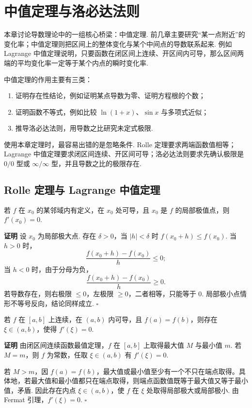 \documentclass[fontset=fandol]{ctexart}
\newcounter{DefinitionCounter}[section]
\newcounter{TheoremCounter}[section]
\newcounter{PropositionCounter}[section]
\newcounter{ExampleCounter}[section]
\newcounter{ExerciseCounter}[section]
\newcounter{ProblemCounter}[section]
\newcounter{ConclusionCounter}[section]
\newenvironment{proofdetail}{\par\noindent\textbf{证明}\quad}{\hfill$\square$\par\vspace{0.8em}}
\newcommand{\renewEnvironmentCounter}{\setcounter{DefinitionCounter}{0}\setcounter{TheoremCounter}{0}\setcounter{PropositionCounter}{0}\setcounter{ExampleCounter}{0}\setcounter{ExerciseCounter}{0}\setcounter{ProblemCounter}{0}\setcounter{ConclusionCounter}{0}}
\begin{document}
\section{中值定理与洛必达法则}
\renewEnvironmentCounter

本章讨论导数理论中的一组核心桥梁：中值定理. 前几章主要研究“某一点附近”的变化率；中值定理则把区间上的整体变化与某个中间点的导数联系起来. 例如 Lagrange 中值定理说明，只要函数在闭区间上连续、开区间内可导，那么区间两端的平均变化率一定等于某个内点的瞬时变化率.

中值定理的作用主要有三类：
\begin{enumerate}[label=(\arabic*),leftmargin=2em]
\item 证明存在性结论，例如证明某点导数为零、证明方程根的个数；
\item 证明函数不等式，例如比较 $\ln(1+x)$、$\sin x$ 与多项式近似；
\item 推导洛必达法则，用导数之比研究未定式极限.
\end{enumerate}

使用本章定理时，最容易出错的是忽略条件. Rolle 定理要求两端函数值相等；Lagrange 中值定理要求闭区间连续、开区间可导；洛必达法则要求先确认极限是 $0/0$ 型或 $\infty/\infty$ 型，并且导数之比的极限存在.

\subsection{Rolle 定理与 Lagrange 中值定理}

\begin{theorem}[Fermat 引理]
若 $f$ 在 $x_0$ 的某邻域内有定义，在 $x_0$ 处可导，且 $x_0$ 是 $f$ 的局部极值点，则 $f'(x_0)=0$.
\end{theorem}
\begin{proofdetail}
设 $x_0$ 为局部极大点. 存在 $\delta>0$，当 $|h|<\delta$ 时 $f(x_0+h)\leq f(x_0)$. 当 $h>0$ 时，
\[
\frac{f(x_0+h)-f(x_0)}{h}\leq0;
\]
当 $h<0$ 时，由于分母为负，
\[
\frac{f(x_0+h)-f(x_0)}{h}\geq0.
\]
若导数存在，则右极限 $\leq0$，左极限 $\geq0$，二者相等，只能等于 $0$. 局部极小点情形不等号反向，结论同样成立.
\end{proofdetail}

\begin{theorem}[Rolle 定理]
若 $f$ 在 $[a,b]$ 上连续，在 $(a,b)$ 内可导，且 $f(a)=f(b)$，则存在 $\xi\in(a,b)$，使得 $f'(\xi)=0$.
\end{theorem}
\begin{proofdetail}
由闭区间连续函数最值定理，$f$ 在 $[a,b]$ 上取得最大值 $M$ 与最小值 $m$. 若 $M=m$，则 $f$ 为常数，任取 $\xi\in(a,b)$ 有 $f'(\xi)=0$.

若 $M>m$，因 $f(a)=f(b)$，最大值或最小值至少有一个不只在端点取得。具体地，若最大值和最小值都只在端点取得，则端点函数值既等于最大值又等于最小值，矛盾. 因此存在内点 $\xi\in(a,b)$，使 $f$ 在 $\xi$ 处取得局部极大或局部极小. 由 Fermat 引理，$f'(\xi)=0$.
\end{proofdetail}
\end{document}
